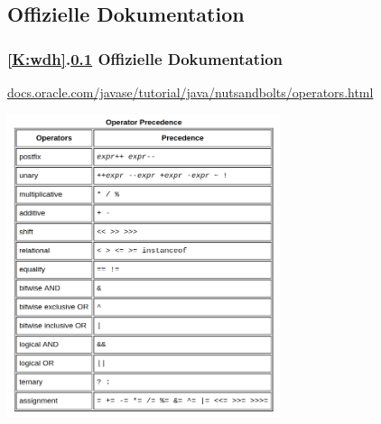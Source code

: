 \documentclass[9pt,german]{beamer}%
\begin{document}
\def\stitle{Offizielle Dokumentation}
\subsection{\stitle}\label{S:Dokumentation}
\begin{frame}[fragile]%
  \frametitle{\ref{K:wdh}.\ref{S:Dokumentation} \stitle}%
\url{docs.oracle.com/javase/tutorial/java/nutsandbolts/operators.html}

\begin{center}
\includegraphics[width=0.6\textwidth]{grundl-boolalgnegation/operatorPrecedence}
\end{center}
\end{frame}


\def\stitle{De Morgansche Gesetze}
\end{document}
